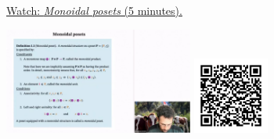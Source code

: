 
\begin{minipage}{10cm}
    \href{https://act4e-spring21.netlify.app/videos/spring2021-par-feedback:mon-cat:mon-pos.html}{Watch: \emph{Monoidal posets} (5 minutes).}
        
    \href{https://act4e-spring21.netlify.app/videos/spring2021-par-feedback:mon-cat:mon-pos.html}{\includegraphics[height=3.5cm]{spring2021-par-feedback:mon-cat:mon-pos/thumbnails.jpg}}
    \href{https://act4e-spring21.netlify.app/videos/spring2021-par-feedback:mon-cat:mon-pos.html}{\includegraphics[height=2.5cm]{spring2021-par-feedback:mon-cat:mon-pos/qrcode.png}}
\end{minipage}
